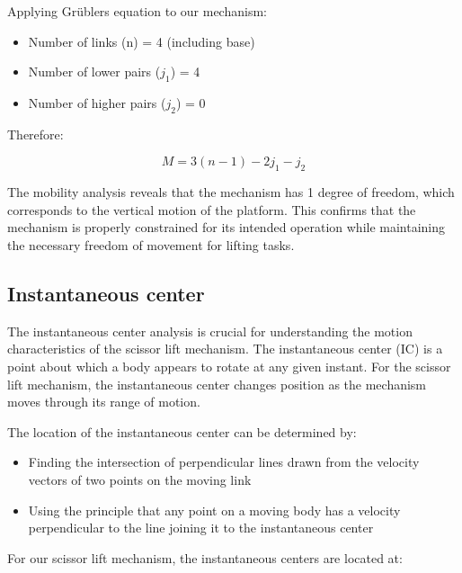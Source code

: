 \documentclass[../../main]{subfiles}
\begin{document}
Applying Grübler\textquotesingle s equation to our mechanism:

\begin{itemize}
\item
  Number of links (n) = 4 (including base)
\item
  Number of lower pairs ($j_1$) = 4
\item
  Number of higher pairs ($j_2$) = 0
\end{itemize}

Therefore:

\begin{equation}
  M = 3(n - 1) - 2j_1 - j_2
  \label{eq:grubler}
\end{equation}

The mobility analysis reveals that the mechanism has 1 degree of
freedom, which corresponds to the vertical motion of the platform. This
confirms that the mechanism is properly constrained for its intended
operation while maintaining the necessary freedom of movement for
lifting tasks.

\subsection{Instantaneous center}

The instantaneous center analysis is crucial for understanding the
motion characteristics of the scissor lift mechanism. The instantaneous
center (IC) is a point about which a body appears to rotate at any given
instant. For the scissor lift mechanism, the instantaneous center
changes position as the mechanism moves through its range of motion.

The location of the instantaneous center can be determined by:

\begin{itemize}
\item
  Finding the intersection of perpendicular lines drawn from the
  velocity vectors of two points on the moving link
\item
  Using the principle that any point on a moving body has a velocity
  perpendicular to the line joining it to the instantaneous center
\end{itemize}

For our scissor lift mechanism, the instantaneous centers are located
at:
\end{document}
